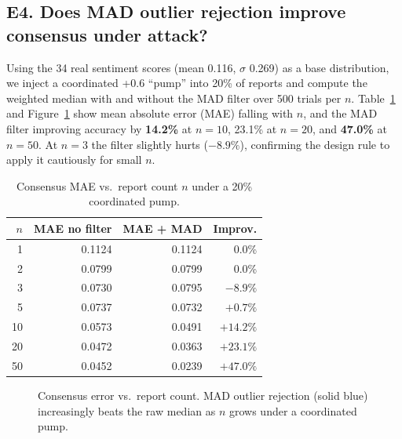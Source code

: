 \documentclass[10pt,twocolumn]{article}
\begin{document}
\subsection{E4. Does MAD outlier rejection improve consensus under attack?}

Using the 34 real sentiment scores (mean 0.116, $\sigma$ 0.269) as a base distribution, we inject a coordinated +0.6 ``pump'' into 20\% of reports and compute the weighted median with and without the MAD filter over 500 trials per $n$. Table~\ref{tab:consensus} and Figure~\ref{fig:consensus} show mean absolute error (MAE) falling with $n$, and the MAD filter improving accuracy by \textbf{14.2\%} at $n{=}10$, 23.1\% at $n{=}20$, and \textbf{47.0\%} at $n{=}50$. At $n{=}3$ the filter slightly hurts ($-8.9\%$), confirming the design rule to apply it cautiously for small $n$.

\begin{table}[h]
\centering
\caption{Consensus MAE vs.\ report count $n$ under a 20\% coordinated pump.}
\label{tab:consensus}
\scriptsize
\begin{tabular}{@{}rrrr@{}}
\toprule
\textbf{$n$} & \textbf{MAE no filter} & \textbf{MAE + MAD} & \textbf{Improv.} \\
\midrule
1  & 0.1124 & 0.1124 & 0.0\% \\
2  & 0.0799 & 0.0799 & 0.0\% \\
3  & 0.0730 & 0.0795 & $-8.9\%$ \\
5  & 0.0737 & 0.0732 & $+0.7\%$ \\
10 & 0.0573 & 0.0491 & $+14.2\%$ \\
20 & 0.0472 & 0.0363 & $+23.1\%$ \\
50 & 0.0452 & 0.0239 & $+47.0\%$ \\
\bottomrule
\end{tabular}
\end{table}

\begin{figure}[h]
\centering
{}
\caption{Consensus error vs.\ report count. MAD outlier rejection (solid blue) increasingly beats the raw median as $n$ grows under a coordinated pump.}
\label{fig:consensus}
\end{figure}
\end{document}
